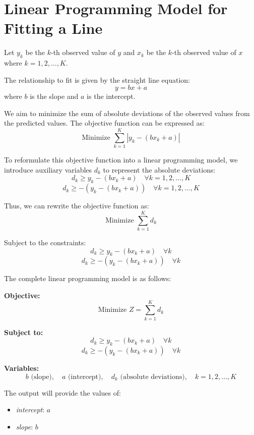 \documentclass{article}
\begin{document}
\section*{Linear Programming Model for Fitting a Line}

Let \( y_k \) be the \( k \)-th observed value of \( y \) and \( x_k \) be the \( k \)-th observed value of \( x \) where \( k = 1, 2, \ldots, K \).

The relationship to fit is given by the straight line equation:
\[
y = bx + a
\]
where \( b \) is the slope and \( a \) is the intercept. 

We aim to minimize the sum of absolute deviations of the observed values from the predicted values. The objective function can be expressed as:
\[
\text{Minimize } \sum_{k=1}^{K} |y_k - (bx_k + a)|
\]

To reformulate this objective function into a linear programming model, we introduce auxiliary variables \( d_k \) to represent the absolute deviations:
\[
d_k \geq y_k - (bx_k + a) \quad \forall k = 1, 2, \ldots, K
\]
\[
d_k \geq -(y_k - (bx_k + a)) \quad \forall k = 1, 2, \ldots, K
\]

Thus, we can rewrite the objective function as:
\[
\text{Minimize } \sum_{k=1}^{K} d_k
\]

Subject to the constraints:
\[
d_k \geq y_k - (bx_k + a) \quad \forall k
\]
\[
d_k \geq -(y_k - (bx_k + a)) \quad \forall k
\]

The complete linear programming model is as follows:

\textbf{Objective:}
\[
\text{Minimize } Z = \sum_{k=1}^{K} d_k
\]

\textbf{Subject to:}
\[
d_k \geq y_k - (bx_k + a) \quad \forall k
\]
\[
d_k \geq -(y_k - (bx_k + a)) \quad \forall k
\]

\textbf{Variables:}
\[
b \text{ (slope)}, \quad a \text{ (intercept)}, \quad d_k \text{ (absolute deviations)}, \quad k = 1, 2, \ldots, K
\]

The output will provide the values of:
\begin{itemize}
    \item \textit{intercept}: \( a \)
    \item \textit{slope}: \( b \)
\end{itemize}
\end{document}
